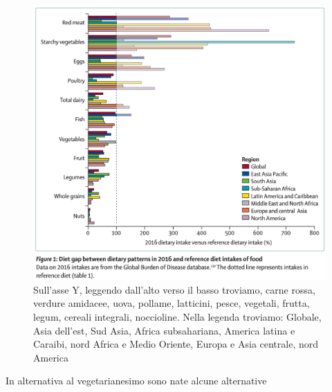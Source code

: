 \documentclass[12pt]{book} %
\begin{document}
\begin{figure}[H]
  \begin{minipage}{17cm}
    \includegraphics[width=17cm]{images/Libro-img023.png}
    \caption{Sull'asse Y, leggendo dall'alto verso il basso troviamo, carne rossa, verdure
amidacee, uova, pollame, latticini, pesce, vegetali, frutta, legum, cereali integrali, noccioline. 
Nella legenda troviamo: Globale, Asia dell'est, Sud Asia, Africa subsahariana, America latina e Caraibi, nord Africa e Medio Oriente, Europa e Asia centrale, nord America }
  \end{minipage}
\end{figure}

In alternativa al vegetarianesimo sono nate alcune alternative
\end{document}
